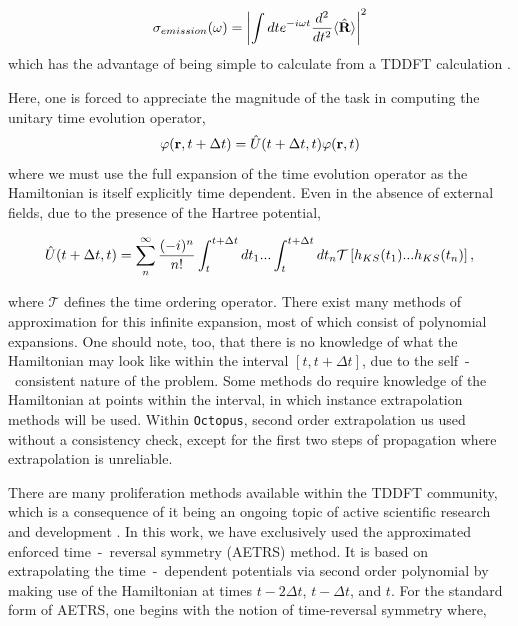 \begin{equation}
    \sigma_{emission}(\omega) = \left| \int dt e^{-i\omega t}\frac{d^{2}}{dt^{2}} \langle \Hat{\textbf{R}} \rangle \right|^{2}
    \label{eqn:HHG}
\end{equation}
which has the advantage of being simple to calculate from a TDDFT calculation \cite{Oct_2015}.


Here, one is forced to appreciate the magnitude of the task in computing the unitary time evolution operator,
\begin{equation}
    \varphi(\textbf{r}, t+\Delta t) = \Hat{U}(t+\Delta t, t)\varphi(\textbf{r},t)
    \label{eqn:UTO}
\end{equation}
where we must use the full expansion of the time evolution operator as the Hamiltonian is itself explicitly time dependent. Even in the absence of external fields, due to the presence of the Hartree potential,

\begin{equation}
    \Hat{U}(t+\Delta t, t) = \sum_{n}^{\infty} \frac{(-i)^{n}}{n!} \int_{t}^{t+\Delta t} dt_{1} ... \int_{t}^{t+\Delta t} dt_{n} \mathcal{T}\left[ h_{KS}(t_{1}) ... h_{KS}(t_{n}) \right],
    \label{eqn:UTE}
\end{equation}

where $\mathcal{T}$ defines the time ordering operator. There exist many methods of approximation for this infinite expansion, most of which consist of polynomial expansions. One should note, too, that there is no knowledge of what the Hamiltonian may look like within the interval $\left[ t, t+\Delta t \right]$, due to the self~-~consistent nature of the problem. Some methods do require knowledge of the Hamiltonian at points within the interval, in which instance extrapolation methods will be used. Within \texttt{Octopus}, second order extrapolation us used without a consistency check, except for the first two steps of propagation where extrapolation is unreliable.

There are many proliferation methods available within the TDDFT community, which is a consequence of it being an ongoing topic of active scientific research and development \cite{10.1063/1.1774980,doi:10.1021/acs.jctc.8b00197}. In this work, we have exclusively used the approximated enforced time~-~reversal symmetry (AETRS) method. It is based on extrapolating the time~-~dependent potentials via second order polynomial by making use of the Hamiltonian at times $t-2\Delta t$, $t- \Delta t$, and $t$. For the standard form of AETRS, one begins with the notion of time-reversal symmetry where,

